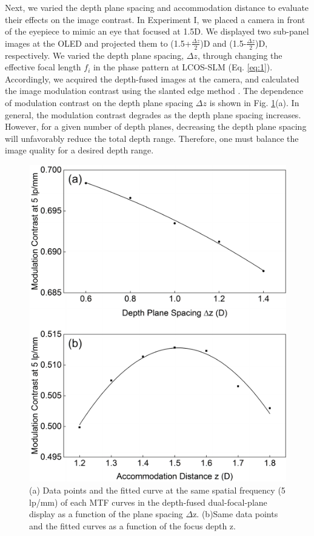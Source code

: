 \documentclass[9pt,twocolumn,twoside]{osajnl}
\begin{document}
Next, we varied the depth plane spacing and accommodation distance to evaluate their effects on the image contrast.  In Experiment I, we placed a camera in front of the eyepiece to mimic an eye that focused at 1.5D. We displayed two sub-panel images at the OLED and projected them to (1.5+$\frac{\Delta z}{2}$)D and (1.5-$\frac{\Delta z}{2}$)D, respectively. We varied the depth plane spacing, $\Delta z$, through changing the effective focal length $f_i$ in the phase pattern at LCOS-SLM (Eq. \ref{eq:1}).  Accordingly, we acquired the depth-fused images at the camera, and calculated the image modulation contrast using the slanted edge method \cite{hu2014design}.  The dependence of modulation contrast on the depth plane spacing $\Delta z$ is shown in Fig. \ref{fig:4}(a). In general, the modulation contrast degrades as the depth plane spacing increases. However, for a given number of depth planes, decreasing the depth plane spacing will unfavorably reduce the total depth range. Therefore, one must balance the image quality for a desired depth range.

\begin{figure}[htbp]
	\centering
	\includegraphics[width=\linewidth]{OMNIfig4}
	\caption{(a) Data points and the fitted curve at the same spatial frequency (5 lp/mm) of each MTF curves in the depth-fused dual-focal-plane display as a function of the plane spacing $\Delta$z. (b)Same data points and the fitted curves as a function of the focus depth z.}
	\label{fig:4}
\end{figure} 
\end{document}
